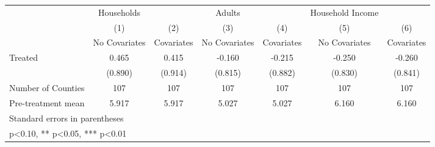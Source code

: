 {
\def\sym#1{\ifmmode^{#1}\else\(^{#1}\)\fi}
\begin{tabular}{l*{6}{c}}
\hline\hline
            &  Households   &               &      Adults   &               &Household Income   &               \\
            &\multicolumn{1}{c}{(1)}&\multicolumn{1}{c}{(2)}&\multicolumn{1}{c}{(3)}&\multicolumn{1}{c}{(4)}&\multicolumn{1}{c}{(5)}&\multicolumn{1}{c}{(6)}\\
            &\multicolumn{1}{c}{No Covariates}&\multicolumn{1}{c}{Covariates}&\multicolumn{1}{c}{No Covariates}&\multicolumn{1}{c}{Covariates}&\multicolumn{1}{c}{No Covariates}&\multicolumn{1}{c}{Covariates}\\
\hline
Treated     &       0.465   &       0.415   &      -0.160   &      -0.215   &      -0.250   &      -0.260   \\
            &     (0.890)   &     (0.914)   &     (0.815)   &     (0.882)   &     (0.830)   &     (0.841)   \\
\hline
Number of Counties&         107   &         107   &         107   &         107   &         107   &         107   \\
Pre-treatment mean&       5.917   &       5.917   &       5.027   &       5.027   &       6.160   &       6.160   \\
\hline\hline
\multicolumn{7}{l}{\footnotesize Standard errors in parentheses}\\
\multicolumn{7}{l}{\footnotesize * p<0.10, ** p<0.05, *** p<0.01}\\
\end{tabular}
}
